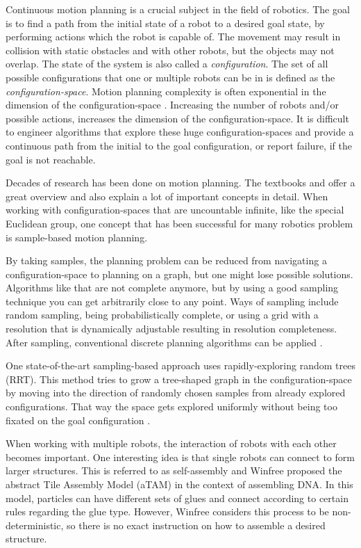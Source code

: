 Continuous motion planning is a crucial subject in the field of robotics.
The goal is to find a path from the initial state of a robot to a desired goal state, by performing actions which the robot is capable of.
The movement may result in collision with static obstacles and with other robots, but the objects may not overlap.
The state of the system is also called a \textit{configuration}.
The set of all possible configurations that one or multiple robots can be in is defined as the \textit{configuration-space}.
Motion planning complexity is often exponential in the dimension of the configuration-space \cite{LaValle2006}.
Increasing the number of robots and/or possible actions, increases the dimension of the configuration-space.
It is difficult to engineer algorithms that explore these huge configuration-spaces and provide a continuous path from the initial to the goal configuration, or report failure, if the goal is not reachable.

Decades of research has been done on motion planning.
The textbooks \cite{LaValle2006} and \cite{Mueller2019} offer a great overview and also explain a lot of important concepts in detail.
When working with configuration-spaces that are uncountable infinite, like the special Euclidean group, one concept that has been successful for many robotics problem is sample-based motion planning.

By taking samples, the planning problem can be reduced from navigating a configu\-ration-space to planning on a graph, but one might lose possible solutions.
Algorithms like that are not complete anymore, but by using a good sampling technique you can get arbitrarily close to any point.
Ways of sampling include random sampling, being probabilistically complete, or using a grid with a resolution that is dynamically adjustable resulting in resolution completeness.
After sampling, conventional discrete planning algorithms can be applied \cite{LaValle2006}.

One state-of-the-art sampling-based approach uses rapidly-exploring random trees (RRT).
This method tries to grow a tree-shaped graph in the configuration-space by moving into the direction of randomly chosen samples from already explored configurations. That way the space gets explored uniformly without being too fixated on the goal configuration \cite{lavalle1998,lavalle2001}.

When working with multiple robots, the interaction of robots with each other becomes important.
One interesting idea is that single robots can connect to form larger structures.
This is referred to as self-assembly and Winfree \cite{winfree1998} proposed the abstract Tile Assembly Model (aTAM) in the context of assembling DNA.
In this model, particles can have different sets of glues and connect according to certain rules regarding the glue type.
However, Winfree considers this process to be non-deterministic, so there is no exact instruction on how to assemble a desired structure.

